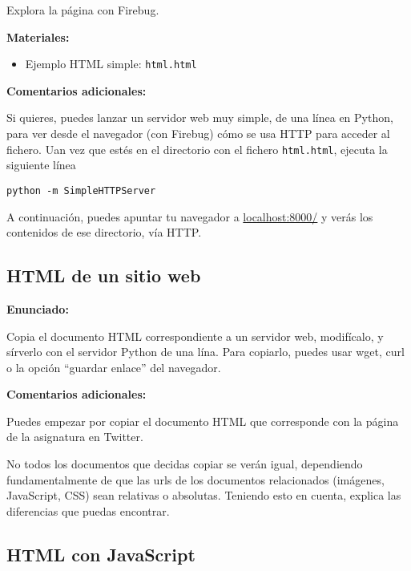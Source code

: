Explora la página con Firebug.

\textbf{Materiales:}

\begin{itemize}
\item Ejemplo HTML simple: \verb|html.html|
\end{itemize}

\textbf{Comentarios adicionales:}

Si quieres, puedes lanzar un servidor web muy simple, de una línea en Python, para ver desde el navegador (con Firebug) cómo se usa HTTP para acceder al fichero. Uan vez que estés en el directorio con el fichero \verb|html.html|, ejecuta la siguiente línea

\begin{verbatim}
python -m SimpleHTTPServer
\end{verbatim}

A continuación, puedes apuntar tu navegador a \url{localhost:8000/} y verás los contenidos de ese directorio, vía HTTP.

\subsection{HTML de un sitio web}
\label{subsec:eje-html-web}

\textbf{Enunciado:}

Copia el documento HTML correspondiente a un servidor web, modifícalo, y sírverlo con el servidor Python de una lína. Para copiarlo, puedes usar wget, curl o la opción ``guardar enlace'' del navegador.

\textbf{Comentarios adicionales:}

Puedes empezar por copiar el documento HTML que corresponde con la página de la asignatura en Twitter.

No todos los documentos que decidas copiar se verán igual, dependiendo fundamentalmente de que las urls de los documentos relacionados (imágenes, JavaScript, CSS) sean relativas o absolutas. Teniendo esto en cuenta, explica las diferencias que puedas encontrar.

\subsection{HTML con JavaScript}
\label{subsec:eje-html-javascript}

